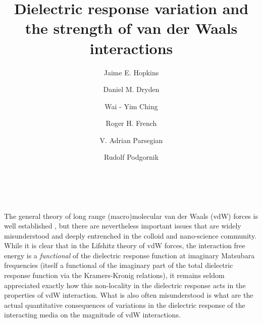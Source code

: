 \documentclass[letterpaper,twocolumn,amsmath,amssymb,floatfix,aps,superscriptaddress]{revtex4}
\begin{document}
\title{Dielectric response variation and the strength of van der Waals interactions}

\author{Jaime E. Hopkins}

\author{Daniel M. Dryden} 

\author{Wai - Yim Ching} 

\author{Roger H. French}

\author{V. Adrian Parsegian}

\author{Rudolf Podgornik}


\begin{abstract}
~
\end{abstract}

\maketitle

The general theory of long range (macro)molecular van der Waals (vdW) forces is well established \cite{Parsegian,Bordag}, but there are  nevertheless important issues that are widely misunderstood and deeply entrenched in the colloid and nano-science community. While it is clear that in the Lifshitz theory of vdW forces, the interaction free energy is a {\sl functional} of the dielectric response function at imaginary Matsubara frequencies (itself a functional of the imaginary part of the total dielectric response function via the Kramers-Kronig relations), it remains seldom appreciated exactly how this non-locality in the dielectric response acts in the properties of vdW interaction. What is also often misunderstood is what are the actual quantitative consequences of variations in the dielectric response of the interacting media on the magnitude of vdW interactions. 
\end{document}
